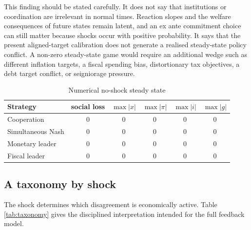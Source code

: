 \documentclass[11pt]{article}
\begin{document}
This finding should be stated carefully.  It does not say that institutions or
coordination are irrelevant in normal times.  Reaction slopes and the welfare
consequences of future states remain latent, and an ex ante commitment choice
can still matter because shocks occur with positive probability.  It says that
the present aligned-target calibration does not generate a realised
steady-state policy conflict.  A non-zero steady-state game would require an
additional wedge such as different inflation targets, a fiscal spending bias,
distortionary tax objectives, a debt target conflict, or seigniorage pressure.

\begin{table}[htbp]
\centering
\caption{Numerical no-shock steady state}
\label{tab:ss}
\begin{tabular}{lccccc}
\toprule
Strategy & social loss & $\max|x|$ & $\max|\pi|$ & $\max|i|$ & $\max|g|$\\
\midrule
Cooperation       & 0 & 0 & 0 & 0 & 0\\
Simultaneous Nash & 0 & 0 & 0 & 0 & 0\\
Monetary leader   & 0 & 0 & 0 & 0 & 0\\
Fiscal leader     & 0 & 0 & 0 & 0 & 0\\
\bottomrule
\end{tabular}
\end{table}

\subsection{A taxonomy by shock}

The shock determines which disagreement is economically active.  Table
\ref{tab:taxonomy} gives the disciplined interpretation intended for the full
feedback model.
\end{document}
